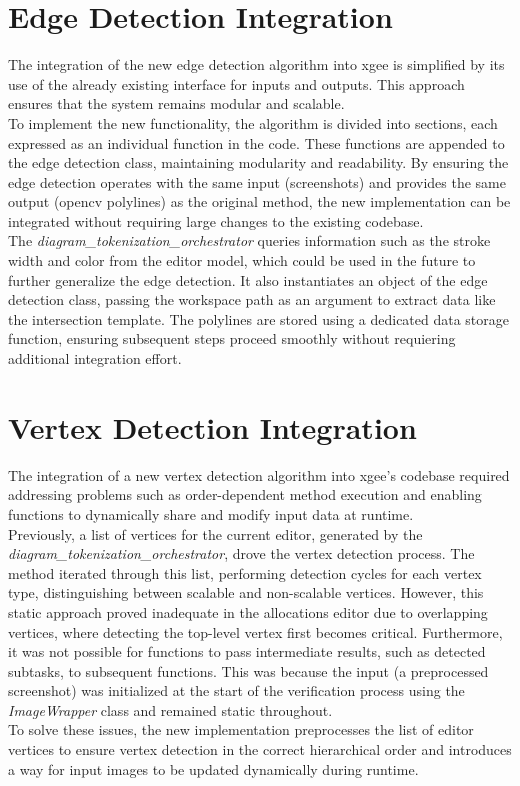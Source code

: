\section{Edge Detection Integration}
The integration of the new edge detection algorithm into \acrshort{xgee} is simplified by its use of the already existing interface for inputs and outputs. This approach ensures that the system remains modular and scalable.\\
To implement the new functionality, the algorithm is divided into sections, each expressed as an individual function in the code. These functions are appended to the edge detection class, maintaining modularity and readability. By ensuring the edge detection operates with the same input (screenshots) and provides the same output (\acrshort{opencv} polylines) as the original method, the new implementation can be integrated without requiring large changes to the existing codebase.\\
The \textit{diagram\_tokenization\_orchestrator} queries information such as the stroke width and color from the editor model, which could be used in the future to further generalize the edge detection. It also instantiates an object of the edge detection class, passing the workspace path as an argument to extract data like the intersection template. The polylines are stored using a dedicated data storage function, ensuring subsequent steps proceed smoothly without requiering additional integration effort. 

\section{Vertex Detection Integration}
The integration of a new vertex detection algorithm into \acrshort{xgee}'s codebase required addressing problems such as order-dependent method execution and enabling functions to dynamically share and modify input data at runtime.\\
Previously, a list of vertices for the current editor, generated by the \textit{diagram\_tokenization\_orchestrator}, drove the vertex detection process. The method iterated through this list, performing detection cycles for each vertex type, distinguishing between scalable and non-scalable vertices. However, this static approach proved inadequate in the allocations editor due to overlapping vertices, where detecting the top-level vertex first becomes critical. Furthermore, it was not possible for functions to pass intermediate results, such as detected subtasks, to subsequent functions. This was because the input (a preprocessed screenshot) was initialized at the start of the verification process using the \textit{ImageWrapper} class and remained static throughout.\\
To solve these issues, the new implementation preprocesses the list of editor vertices to ensure vertex detection in the correct hierarchical order and introduces a way for input images to be updated dynamically during runtime.


